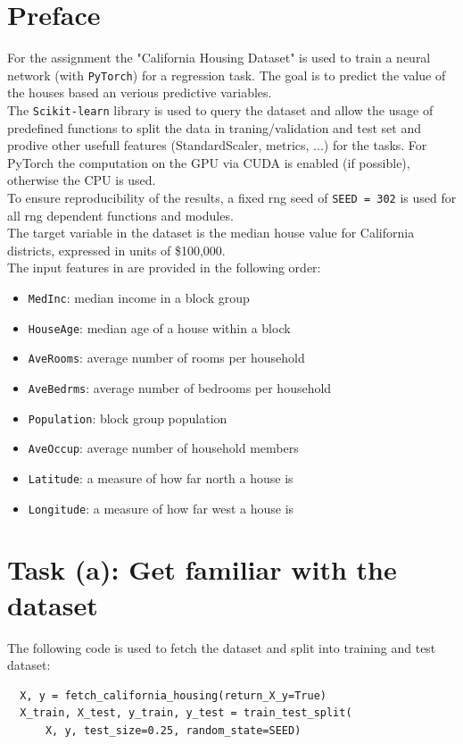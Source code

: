 \documentclass[11pt,a4paper]{article}
\begin{document}
\section{Preface}
\noindent For the assignment the "California Housing Dataset" is used to train a neural network (with \texttt{PyTorch}) for a regression task. The goal is to
predict the value of the houses based an verious predictive variables.
\\The \texttt{Scikit-learn} library is used to query the dataset and allow the usage of predefined functions to split the data in traning/validation and test set and
prodive other usefull features (StandardScaler, metrics, ...) for the tasks.
For PyTorch the computation on the GPU via CUDA is enabled (if possible), otherwise the CPU is used.
\\To ensure reproducibility of the results, a fixed rng seed of \texttt{SEED = 302} is used for all rng dependent functions and modules.
\vspace{1em}
\\The target variable in the dataset is the median house value for California districts, expressed in units of
\$100{,}000.
\\The input features in are provided in the following order:
\begin{itemize}[nosep]
  \item \texttt{MedInc}: median income in a block group
  \item \texttt{HouseAge}: median age of a house within a block
  \item \texttt{AveRooms}: average number of rooms per household
  \item \texttt{AveBedrms}: average number of bedrooms per household
  \item \texttt{Population}: block group population
  \item \texttt{AveOccup}: average number of household members
  \item \texttt{Latitude}: a measure of how far north a house is
  \item \texttt{Longitude}: a measure of how far west a house is
\end{itemize}

\clearpage
\section{Task (a): Get familiar with the dataset}
\label{sec:datasets}

The following code is used to fetch the dataset and split into training and test dataset:
\begin{lstlisting}
  X, y = fetch_california_housing(return_X_y=True)
  X_train, X_test, y_train, y_test = train_test_split(
      X, y, test_size=0.25, random_state=SEED)
\end{lstlisting}
\end{document}
